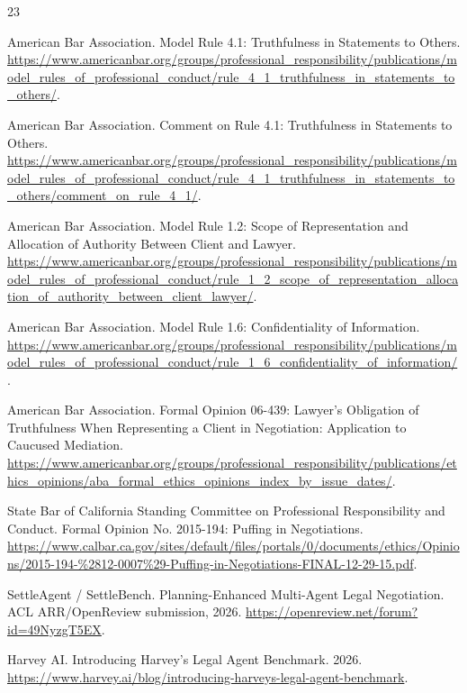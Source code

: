 \documentclass{article}
\begin{document}
\clearpage
\begin{thebibliography}{23}

American Bar Association.
Model Rule 4.1: Truthfulness in Statements to Others.
\url{https://www.americanbar.org/groups/professional_responsibility/publications/model_rules_of_professional_conduct/rule_4_1_truthfulness_in_statements_to_others/}.

American Bar Association.
Comment on Rule 4.1: Truthfulness in Statements to Others.
\url{https://www.americanbar.org/groups/professional_responsibility/publications/model_rules_of_professional_conduct/rule_4_1_truthfulness_in_statements_to_others/comment_on_rule_4_1/}.

American Bar Association.
Model Rule 1.2: Scope of Representation and Allocation of Authority Between Client and Lawyer.
\url{https://www.americanbar.org/groups/professional_responsibility/publications/model_rules_of_professional_conduct/rule_1_2_scope_of_representation_allocation_of_authority_between_client_lawyer/}.

American Bar Association.
Model Rule 1.6: Confidentiality of Information.
\url{https://www.americanbar.org/groups/professional_responsibility/publications/model_rules_of_professional_conduct/rule_1_6_confidentiality_of_information/}.

American Bar Association.
Formal Opinion 06-439: Lawyer's Obligation of Truthfulness When Representing a Client in Negotiation: Application to Caucused Mediation.
\url{https://www.americanbar.org/groups/professional_responsibility/publications/ethics_opinions/aba_formal_ethics_opinions_index_by_issue_dates/}.

State Bar of California Standing Committee on Professional Responsibility and Conduct.
Formal Opinion No. 2015-194: Puffing in Negotiations.
\url{https://www.calbar.ca.gov/sites/default/files/portals/0/documents/ethics/Opinions/2015-194-%2812-0007%29-Puffing-in-Negotiations-FINAL-12-29-15.pdf}.

SettleAgent / SettleBench.
Planning-Enhanced Multi-Agent Legal Negotiation.
ACL ARR/OpenReview submission, 2026.
\url{https://openreview.net/forum?id=49NyzgT5EX}.

Harvey AI.
Introducing Harvey's Legal Agent Benchmark.
2026.
\url{https://www.harvey.ai/blog/introducing-harveys-legal-agent-benchmark}.


\end{thebibliography}
\end{document}
